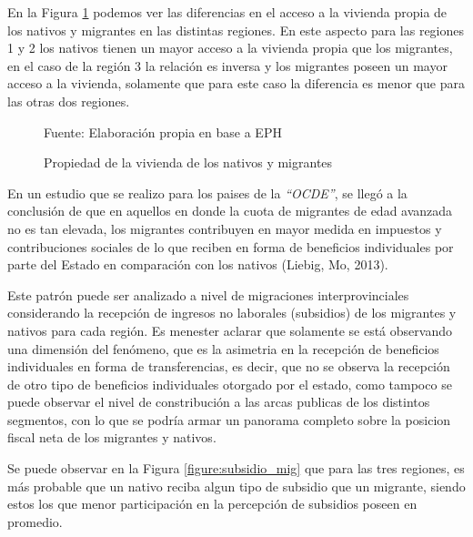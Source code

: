 \documentclass[12pt,a4paper]{article}
\begin{document}
En la Figura \ref{figure:vivienda_mig} podemos ver las diferencias en el acceso a la vivienda propia de los nativos y migrantes  en las distintas regiones. En este aspecto para las regiones 1 y 2 los nativos tienen un mayor acceso a la vivienda propia que los migrantes, en el caso de la región 3 la relación es inversa y los migrantes poseen un mayor acceso a la vivienda, solamente que para este caso la diferencia es menor que para las otras dos regiones.

\begin{figure}[ht!]
\begin{center}
\caption{Propiedad de la vivienda de los nativos y migrantes}
\label{figure:vivienda_mig}
 
\end{center}
\begin{flushleft}
\begin{scriptsize}
Fuente: Elaboración propia en base a EPH
\end{scriptsize}
\end{flushleft}
\end{figure}
\newpage


En un estudio que se realizo para los paises de la \textit{``OCDE''}, se llegó a la conclusión de que en aquellos en donde la cuota de migrantes de edad avanzada no es tan elevada, los migrantes contribuyen en mayor medida en impuestos y contribuciones sociales de lo que reciben en forma de beneficios individuales por parte del Estado en comparación con los nativos (Liebig, Mo, 2013). 

Este patrón puede ser analizado a nivel de migraciones interprovinciales considerando la recepción de ingresos no laborales (subsidios) de los migrantes y nativos para cada región. Es menester aclarar que solamente se está observando una dimensión del fenómeno, que es la asimetria en la recepción de beneficios individuales en forma de transferencias, es decir, que no se observa la recepción de otro tipo de beneficios individuales otorgado por el estado, como tampoco se puede observar el nivel de constribución a las arcas publicas de los distintos segmentos, con lo que se podría armar un panorama completo sobre la posicion fiscal neta de los migrantes y nativos.

Se puede observar en la Figura \ref{figure:subsidio_mig} que para las tres regiones, es más probable que un nativo reciba algun tipo de subsidio que un migrante, siendo estos los que menor participación en la percepción de subsidios poseen en promedio.
\end{document}
